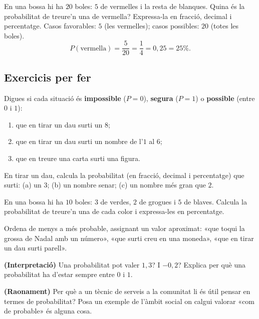 \begin{exresolt}
En una bossa hi ha $20$ boles: $5$ de vermelles i la resta de blanques. Quina és la
probabilitat de treure'n una de vermella? Expressa-la en fracció, decimal i percentatge.
\solucio
Casos favorables: $5$ (les vermelles); casos possibles: $20$ (totes les boles).
\[
P(\text{vermella})=\frac{5}{20}=\frac{1}{4}=0,25=25\%.
\]
\end{exresolt}

\subsection{Exercicis per fer}

\begin{exercicis}
\begin{exlist}
  \item Digues si cada situació és \textbf{impossible} ($P=0$), \textbf{segura} ($P=1$)
        o \textbf{possible} (entre $0$ i $1$):
    \begin{enumerate}[label=\alph*), leftmargin=1.6em, topsep=2pt]
      \item que en tirar un dau surti un $8$;
      \item que en tirar un dau surti un nombre de l'$1$ al $6$;
      \item que en treure una carta surti una figura.
    \end{enumerate}
  \item En tirar un dau, calcula la probabilitat (en fracció, decimal i percentatge) que
        surti: (a) un $3$; (b) un nombre senar; (c) un nombre més gran que $2$.
  \item En una bossa hi ha $10$ boles: $3$ de verdes, $2$ de grogues i $5$ de blaves.
        Calcula la probabilitat de treure'n una de cada color i expressa-les en
        percentatge.
  \item Ordena de menys a més probable, assignant un valor aproximat: «que toqui la
        grossa de Nadal amb un número», «que surti creu en una moneda», «que en tirar un
        dau surti parell».
  \item \textbf{(Interpretació)} Una probabilitat pot valer $1,3$? I $-0,2$? Explica per
        què una probabilitat ha d'estar sempre entre $0$ i $1$.
  \item \textbf{(Raonament)} Per què a un tècnic de serveis a la comunitat li és útil
        pensar en termes de probabilitat? Posa un exemple de l'àmbit social on calgui
        valorar «com de probable» és alguna cosa.
\end{exlist}
\end{exercicis}

